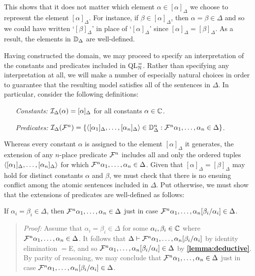 This shows that it does not matter which element $\alpha\in[\alpha]_\Delta$ we choose to represent the element $[\alpha]_\Delta$.
For instance, if $\beta\in[\alpha]_\Delta$, then $\alpha=\beta\in\Delta$ and so we could have written `$[\beta]_\Delta$' in place of `$[\alpha]_\Delta$' since $[\alpha]_\Delta=[\beta]_\Delta$.
As a result, the elements in $\mathbb{D}_\Delta$ are well-defined. 

Having constructed the domain, we may proceed to specify an interpretation of the constants and predicates included in QL$^=_{\mathbb{N}}$.
Rather than specifying any interpretation at all, we will make a number of especially natural choices in order to guarantee that the resulting model satisfies all of the sentences in $\Delta$.
In particular, consider the following definitions:
  \begin{enumerate}[leftmargin=1.5in]
    \item[\it Constants:] $\mathcal{I}_\Delta(\alpha)=[\alpha]_\Delta$ for all constants $\alpha\in\mathbb{C}$. 
    \item[\it Predicates:] $\mathcal{I}_\Delta(\mathcal{F}^n)=\lbrace\langle[\alpha_1]_\Delta,\ldots,[\alpha_n]_\Delta\rangle\in\mathbb{D}_\Delta^n:\mathcal{F}^n\alpha_1,\ldots,\alpha_n\in\Delta\rbrace$.
  \end{enumerate}
Whereas every constant $\alpha$ is assigned to the element $[\alpha]_\Delta$ it generates, the extension of any $n$-place predicate $\mathcal{F}^n$ includes all and only the ordered tuples $\langle[\alpha_1]_\Delta,\ldots,[\alpha_n]_\Delta\rangle$ for which $\mathcal{F}^n\alpha_1,\ldots,\alpha_n\in\Delta$.
Given that $[\alpha]_\Delta=[\beta]_\Delta$ may hold for distinct constants $\alpha$ and $\beta$, we must check that there is no ensuing conflict among the atomic sentences included in $\Delta$.
Put otherwise, we must show that the extensions of predicates are well-defined as follows:





\begin{Lthm} \label{lemma:preddef}
  If $\alpha_i=\beta_i\in\Delta$, then $\mathcal{F}^n\alpha_1,\ldots,\alpha_n\in\Delta$ just in case $\mathcal{F}^n\alpha_1,\ldots,\alpha_n[\beta_i/\alpha_i]\in\Delta$.
\end{Lthm}

\begin{quote} 
  \textit{Proof:} 
  Assume that $\alpha_i=\beta_i\in\Delta$ for some $\alpha_i,\beta_i\in\mathbb{C}$ where $\mathcal{F}^n\alpha_1,\ldots,\alpha_n\in\Delta$.
  It follows that $\Delta\vdash\mathcal{F}^n\alpha_1,\ldots,\alpha_n[\beta_i/\alpha_i]$ by identity elimination $=$E, and so $\mathcal{F}^n\alpha_1,\ldots,\alpha_n[\beta_i/\alpha_i]\in\Delta$ by \textbf{\ref{lemma:deductive}}.
  By parity of reasoning, we may conclude that $\mathcal{F}^n\alpha_1,\ldots,\alpha_n\in\Delta$ just in case $\mathcal{F}^n\alpha_1,\ldots,\alpha_n[\beta_i/\alpha_i]\in\Delta$.
\end{quote}


